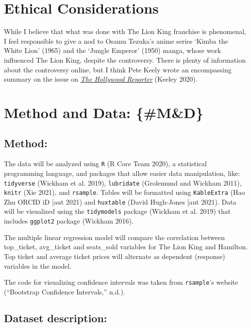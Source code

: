 \documentclass[
]{article}
\begin{document}
\hypertarget{ethical-considerations}{%
\section{Ethical Considerations}\label{ethical-considerations}}

While I believe that what was done with The Lion King franchise is phenomenal, I feel responsible to give a nod to Osamu Tezuka's anime series `Kimba the White Lion' (1965) and the `Jungle Emperor' (1950) manga, whose work influenced The Lion King, despite the controversy. There is plenty of information about the controversy online, but I think Pete Keely wrote an encompassing summary on the issue on \href{https://www.hollywoodreporter.com/heat-vision/lion-king-kimba-white-lion-does-disney-need-come-clean-1225822}{\emph{The Hollywood Reporter}} (Keeley 2020).

\hypertarget{method-and-data-md}{%
\section{Method and Data: \{\#M\&D\}}\label{method-and-data-md}}

\hypertarget{method}{%
\subsection{Method:}\label{method}}

The data will be analyzed using \texttt{R} (R Core Team 2020), a statistical programming language, and packages that allow easier data manipulation, like: \texttt{tidyverse} (Wickham et al. 2019), \texttt{lubridate} (Grolemund and Wickham 2011), \texttt{knitr} (Xie 2021), and \texttt{rsample}. Tables will be formatted using \texttt{KableExtra} (Hao Zhu ORCID iD {[}aut 2021) and \texttt{huxtable} (David Hugh-Jones {[}aut 2021). Data will be visualized using the \texttt{tidymodels} package (Wickham et al. 2019) that includes \texttt{ggplot2} package (Wickham 2016).

The multiple linear regression model will compare the correlation between top\_ticket, avg\_ticket and seats\_sold variables for The Lion King and Hamilton. Top ticket and average ticket prices will alternate as dependent (response) variables in the model.

The code for visualizing confidence intervals was taken from \texttt{rsample}'s website (``Bootstrap Confidence Intervals,'' n.d.).

\hypertarget{dataset-description}{%
\subsection{Dataset description:}\label{dataset-description}}
\end{document}
